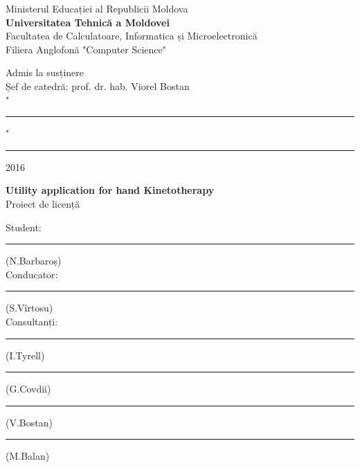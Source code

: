 \begin{titlepage}

\newcommand{\HRule}{\rule{\linewidth}{0.5mm}} %

\center %
 

Ministerul Educației al Republicii Moldova\\ %
\textbf{Universitatea Tehnică a Moldovei}\\%
Facultatea de Calculatoare, Informatica și Microelectronică\\
Filiera Anglofonă "Computer Science"\\


\vspace{2cm}



\hfill Admis la susținere\\
\hfill Șef de catedră: prof. dr. hab. Viorel Bostan\\

\vspace{0.4cm}
\hfill "\rule{0.75cm}{0.2mm}" \ \rule{3cm}{0.2mm} 2016
\vspace{3cm}




\begin{center}
{\LARGE \textbf{Utility application for hand Kinetotherapy}}\\
\vspace{0.6cm}
Proiect de licență
\end{center}
\vspace{1cm}


\hfill Student: \rule{3.9cm}{0.2mm}(N.Barbaroș)\\
\vspace{0.2cm}
\hfill Conducator: \rule{4cm}{0.2mm}(S.Vîrtosu)\\
\vspace{0.2cm}
\hfill Consultanți: \rule{4.2cm}{0.2mm}(I.Tyrell)\\
\vspace{0.2cm}
\hfill \rule{4cm}{0.2mm}(G.Covdii)\\
\vspace{0.2cm}
\hfill \rule{3.9cm}{0.2mm}(V.Bostan)\\
\vspace{0.2cm}
\hfill \rule{4cm}{0.2mm}(M.Balan)\\
\vspace{4cm}




\end{titlepage}
